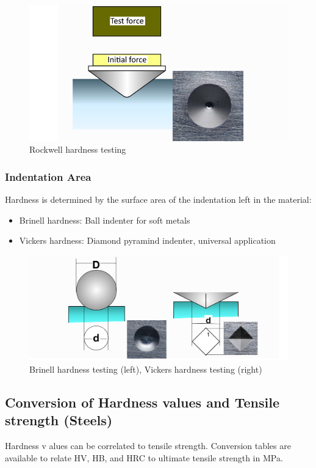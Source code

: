 \documentclass{article}
\begin{document}
\begin{figure}[ht!]
  \centering
  \includegraphics[width=.6\textwidth]{media/Rockwell_hardness.png}
  \caption*{Rockwell hardness testing}
\end{figure}

\subsubsection{Indentation Area}
Hardness is determined by the surface area of the indentation left in the material:
\begin{itemize}
  \item Brinell hardness: Ball indenter for soft metals
  \item Vickers hardness: Diamond pyramind indenter, universal application
\end{itemize}

\begin{figure}[ht!]
  \centering
  \includegraphics[width=.6\textwidth]{media/area_hardness.png}
  \caption*{Brinell hardness testing (left), Vickers hardness testing (right)}
\end{figure}

\newpage
\subsection{Conversion of Hardness values and Tensile strength (Steels)}
Hardness v alues can be correlated to tensile strength. Conversion tables are available to
relate HV, HB, and HRC to ultimate tensile strength in MPa.
\end{document}
